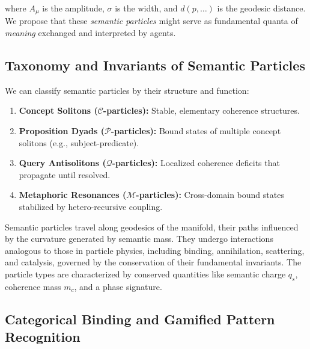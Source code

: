 where \(A_\mu\) is the amplitude, \(\sigma\) is the width, and \(d(p, \dots)\) is the geodesic distance. We propose that these \textit{semantic particles} might serve as fundamental quanta of \textit{meaning} exchanged and interpreted by agents.


\subsection{Taxonomy and Invariants of Semantic Particles}
\label{13.6.1:taxonomy_and_invariants_of_semantic_particles}

We can classify semantic particles by their structure and function:

\begin{enumerate}

    \item \textbf{Concept Solitons (\(\mathcal{C}\)-particles):} Stable, elementary coherence structures.

    \item \textbf{Proposition Dyads (\(\mathcal{P}\)-particles):} Bound states of multiple concept solitons (e.g., subject-predicate).

    \item \textbf{Query Antisolitons (\(\mathcal{Q}\)-particles):} Localized coherence deficits that propagate until resolved.

    \item \textbf{Metaphoric Resonances (\(\mathcal{M}\)-particles):} Cross-domain bound states stabilized by hetero-recursive coupling.

\end{enumerate}

Semantic particles travel along geodesics of the manifold, their paths influenced by the curvature generated by semantic mass. They undergo interactions analogous to those in particle physics, including binding, annihilation, scattering, and catalysis, governed by the conservation of their fundamental invariants. The particle types are characterized by conserved quantities like semantic charge \(q_s\), coherence mass \(m_c\), and a phase signature.


\subsection{Categorical Binding and Gamified Pattern Recognition}
\label{13.6.2:categorical_binding_and_gamified_pattern_recognition}

